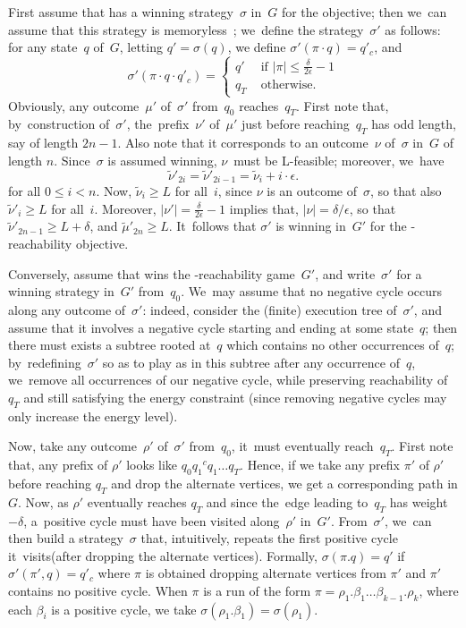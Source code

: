 First assume that  has a winning strategy~$\sigma$ in~$G$ for
the \Lenergy objective; then we~can assume that this strategy is
memoryless~\cite{BouyerFLMS08}; we~define the strategy~$\sigma'$ as follows:
for any state~$q$ of~$G$, letting $q'=\sigma(q)$, we define
$\sigma'(\pi\cdot q)=q'_c$, and
\[
\sigma'(\pi \cdot q \cdot q'_c)= \begin{cases}
  q' & \text{ if $|\pi|\leq \frac{\delta}{2 \epsilon} -1$} \\
  q_T & \text{ otherwise.}
  \end{cases}
\]
Obviously, any outcome~$\mu'$ of~$\sigma'$ from~$q_0$
reaches~$q_T$. First note that, by~construction of~$\sigma'$, the~prefix~$\nu'$
of~$\mu'$ just before reaching~$q_T$ has odd length, say of length $2n-1$. Also note that it corresponds to an outcome~$\nu$
of~$\sigma$ in~$G$ of length $n$. Since~$\sigma$ is assumed winning, $\nu$~must be
L-feasible; moreover, we~have
\[
\tilde\nu'_{2i}=\tilde\nu'_{2i-1} = \tilde\nu_i + i\cdot\epsilon.
\]
for all $0\leq i<n$.  Now, $\tilde\nu_i\geq L$ for all~$i$,
since $\nu$ is an outcome of~$\sigma$, so that also $\tilde\nu'_i\geq L$ for all~$i$. Moreover, $|\nu'|=
\frac{\delta}{2 \epsilon} -1$ implies that, $|\nu|=
\delta/\epsilon$, so that $\tilde\nu'_{2n-1} \geq L+\delta$, and
$\tilde\mu'_{2n}\geq L$. It~follows that $\sigma'$ is winning in~$G'$
for the \Lenergy-reachability objective.


\smallskip
Conversely, assume that  wins the \Lenergy-reachability game~$G'$,
and write~$\sigma'$ for a winning strategy in~$G'$ from~$q_0$.  We~may
assume that no negative cycle occurs along any outcome of~$\sigma'$:
indeed, consider the (finite) execution tree of~$\sigma'$, and assume
that it involves a negative cycle starting and ending at some
state~$q$; then there must exists a subtree rooted at~$q$ which
contains no other occurrences of~$q$; by~redefining~$\sigma'$ so as to play as in this subtree after any occurrence of~$q$, we~remove all occurrences of our negative cycle, while preserving reachability of~$q_T$ and still satisfying the energy constraint (since removing negative cycles may only increase the energy level).

Now, take any outcome~$\rho'$ of~$\sigma'$ from~$q_0$, it~must
eventually reach~$q_T$. First note that, any prefix of $\rho'$ looks like $q_0 {q_1}^c q_1 \ldots q_T$. Hence, if we take any prefix $\pi'$ of $\rho'$ before reaching $q_T$ and drop the alternate vertices, we get a corresponding path in $G$. Now, as $\rho'$ eventually reaches $q_T$ and since the~edge leading to~$q_T$ has weight~$-\delta$, a~positive cycle must have been visited along~$\rho'$ in~$G'$. From~$\sigma'$, we~can then build a strategy~$\sigma$ that, intuitively, repeats the first positive cycle it~visits(after dropping the alternate vertices). Formally, 
$\sigma(\pi. q)= q'$ if $\sigma'(\pi',q)= q'_c$ where $\pi$ is obtained dropping alternate vertices from $\pi'$ and $\pi'$ contains no positive cycle.
When $\pi$ is a run of the form $\pi=\rho_1.\beta_1 \dots \beta_{k-1}.\rho_k$, where each $\beta_i$ is a positive cycle, 
we take $\sigma(\rho_1.\beta_1)=\sigma(\rho_1)$.

